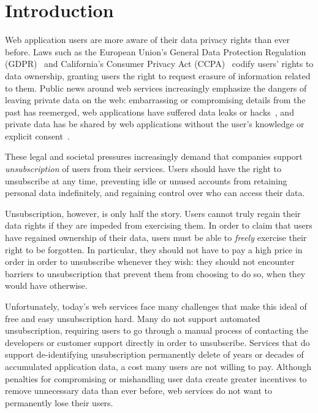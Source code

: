 \section{Introduction}

Web application users are more aware of their data privacy rights than ever before. 
Laws such as the European Union's General Data Protection Regulation (GDPR)~\cite{eu:gdpr} and
California's Consumer Privacy Act (CCPA)~\cite{ca:privacy-act} codify users' rights to 
data ownership, granting users the right to request erasure of information related to them.
%
Public news around web services increasingly emphasize the dangers of leaving private data on the
web: embarrassing or compromising details from the past has reemerged, web applications have
suffered data leaks or hacks~\cite{breach:twitter, breach:fb, breach:marriott, breach:quora}, and
private data has be shared by web applications without the user's knowledge or explicit
consent~\cite{nytimes:fb, npr:data}.

%
These legal and societal pressures increasingly demand that companies support \emph{unsubscription}
of users from their services.  Users should have the right to unsubscribe at any time, preventing
idle or unused accounts from retaining personal data indefinitely, and regaining control over who
can access their data. 
%

%
Unsubscription, however, is only half the story. Users cannot truly regain their data rights if they
are impeded from exercising them. In order to claim that users have regained ownership of their
data, users must be able to \emph{freely} exercise their right to be forgotten. In particular, they
should not have to pay a high price in order in order to unsubscribe whenever they wish: they should
not encounter barriers to unsubscription that prevent them from choosing to do so, when they would have
otherwise. 

Unfortunately, today's web services face many challenges that make this ideal of free and easy
unsubscription hard.  Many do not support automated unsubscription, requiring users to go through a
manual process of contacting the developers or customer support directly in order to unsubscribe.
Services that do support de-identifying unsubscription permanently delete of years or decades of
accumulated application data, a cost many users are not willing to pay.  Although penalties for
compromising or mishandling user data create greater incentives to remove unnecessary data than ever
before, web services do not want to permanently lose their users.

